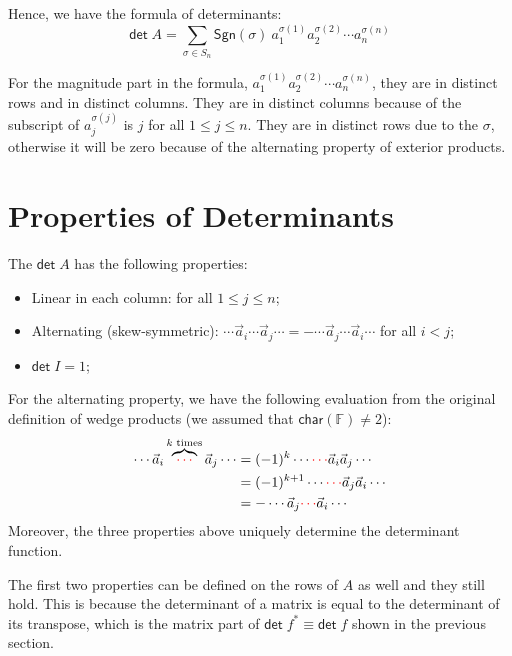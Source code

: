 \documentclass[
	11pt, %
	fleqn, %
	a4paper, %
]{LegrandOrangeBook}
\newcommand{\F}{\mathbb{F}} %
\newcommand{\chart}{\mathsf{char}} %
\renewcommand{\det}{\mathsf{det\;}} %
\newcommand{\sgn}{\mathsf{Sgn}} %
\begin{document}
Hence, we have the formula of determinants:
\[
    \det A = \sum_{\sigma \in S_n} \sgn(\sigma) \ a_1^{\sigma(1)} a_2^{\sigma(2)} \cdots a_n^{\sigma(n)}
\]
\begin{remark}
    For the magnitude part in the formula, $a_1^{\sigma(1)} a_2^{\sigma(2)} \cdots a_n^{\sigma(n)}$, they are in distinct rows and in distinct columns. They are in distinct columns because of the subscript of $a_j^{\sigma(j)}$ is $j$ for all $1 \leq j \leq n$. They are in distinct rows due to the $\sigma$, otherwise it will be zero because of the alternating property of exterior products.
\end{remark}

\newpage

\section{Properties of Determinants}

The $\det A$ has the following properties:
\begin{itemize}
    \item Linear in each column: for all $1 \leq j \leq n$;
    \item Alternating (skew-symmetric): $\cdots \vec{a}_i \cdots \vec{a}_j \cdots = - \cdots \vec{a}_j \cdots \vec{a}_i \cdots$ for all $i < j$;
    \item $\det I = 1$;
\end{itemize}
For the alternating property, we have the following evaluation from the original definition of wedge products (we assumed that $\chart(\F) \neq 2$):
\[
    \begin{split}
        \cdots \vec{a}_i \overbrace{\color{red} \cdots}^{k \text{ times}} \vec{a}_j \cdots & = (-1)^k \cdots {\color{red} \cdots} \vec{a}_i \vec{a}_j \cdots \\
        & = (-1)^{k + 1} \cdots {\color{red} \cdots} \vec{a}_j \vec{a}_i \cdots \\
        & = - \cdots \vec{a}_j {\color{red} \cdots} \vec{a}_i \cdots
    \end{split}
\]
Moreover, the three properties above uniquely determine the determinant function.
\begin{remark}
    The first two properties can be defined on the rows of $A$ as well and they still hold. This is because the determinant of a matrix is equal to the determinant of its transpose, which is the matrix part of $\det f^* \equiv \det f$ shown in the previous section.
\end{remark}
\end{document}
